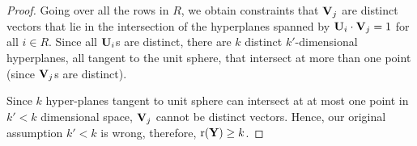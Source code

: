 \documentclass{article}
\begin{document}
\begin{thm:thm}
\begin{proof}
		Going over all the rows in $R$, we obtain constraints that $\mathbf{V}_j$ are distinct vectors that lie in the intersection of the hyperplanes spanned by $\mathbf{U}_i\cdot\mathbf{V}_j=1$ for all $i\in R$.
		Since all $\mathbf{U}_i$s are distinct, there are $k$ distinct $k'$-dimensional hyperplanes, all tangent to the unit sphere, that intersect at more than one point (since $\mathbf{V}_j$s are distinct).

		Since $k$ hyper-planes tangent to unit sphere can intersect at at most one point in $k'<k$ dimensional space, $\mathbf{V}_j$ cannot be distinct vectors. Hence, our original assumption $k'<k$ is wrong, therefore, $\mathrm{r}(\mathbf{Y})\geq k$.
	\end{proof}
\end{thm:thm}

\setcounter{section}{4}
\end{document}
